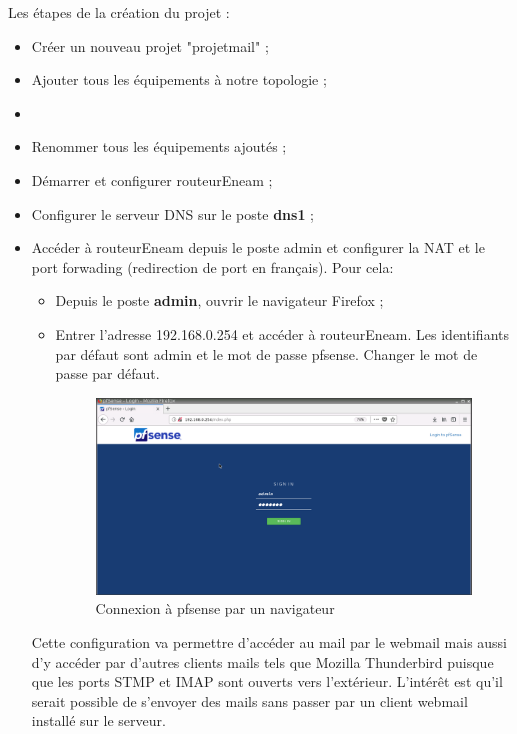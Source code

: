 \documentclass[a4paper,12pt,french]{report} %
\begin{document}
Les étapes de la création du projet :
\begin{itemize}
\item Créer un nouveau projet "projetmail" ;
\item Ajouter tous les équipements à notre topologie ;
\item \item Renommer tous les équipements ajoutés ;
\item Démarrer et configurer routeurEneam ;
\item Configurer le serveur DNS sur le poste \textbf{dns1} ;
\item Accéder à routeurEneam depuis le poste admin et configurer la NAT et le port forwading (redirection de port en français). Pour cela:
	\begin{itemize}
		\item Depuis le poste \textbf{admin}, ouvrir le navigateur Firefox ;
		\item Entrer l'adresse 192.168.0.254 et accéder à routeurEneam. Les identifiants par défaut sont admin et le mot de passe pfsense. Changer le mot de passe par défaut.
		\begin{figure}[H]
		\centering
		\includegraphics[width=483pt]{figure/pfsense_login.png}
		\caption{Connexion à pfsense par un navigateur}	
		\end{figure}	 	
	\end{itemize}
	Cette configuration va permettre d'accéder au mail par le webmail mais aussi d'y accéder par d'autres clients mails tels que Mozilla Thunderbird puisque que les ports STMP et IMAP sont ouverts vers l'extérieur. L'intérêt est qu'il serait possible de s'envoyer des mails sans passer par un client webmail installé sur le serveur.

\end{itemize}
\end{document}
